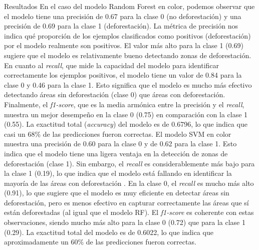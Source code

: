 \documentclass[11pt]{article}
\begin{document}
\begin{section}{Resultados}
En el caso del modelo Random Forest en color, podemos observar que el modelo tiene una precisión de 0.67 para la clase 0 (no deforestación) y una precisión de 0.69 para la clase 1 (deforestación). La métrica de precisión nos indica qué proporción de los ejemplos clasificados como positivos (deforestación) por el modelo realmente son positivos. El valor más alto para la clase 1 (0.69) sugiere que el modelo es relativamente bueno detectando zonas de deforestación. En cuanto al \textit{recall}, que mide la capacidad del modelo para identificar correctamente los ejemplos positivos, el modelo tiene un valor de 0.84 para la clase 0 y 0.46 para la clase 1. Esto significa que el modelo es mucho más efectivo detectando áreas sin deforestación (clase 0) que áreas con deforestación. Finalmente, el \textit{f1-score}, que es la media armónica entre la precisión y el \textit{recall}, muestra un mejor desempeño en la clase 0 (0.75) en comparación con la clase 1 (0.55). La exactitud total (\textit{accuracy}) del modelo es de 0.6796, lo que indica que casi un 68\% de las predicciones fueron correctas. El modelo SVM en color muestra una precisión de 0.60 para la clase 0 y de 0.62 para la clase 1. Esto indica que el modelo tiene una ligera ventaja en la detección de zonas de deforestación (clase 1). Sin embargo, el \textit{recall} es considerablemente más bajo para la clase 1 (0.19), lo que indica que el modelo está fallando en identificar la mayoría de las áreas con deforestación . En la clase 0, el \textit{recall} es mucho más alto (0.91), lo que sugiere que el modelo es muy eficiente en detectar áreas sin deforestación, pero es menos efectivo en capturar correctamente las áreas que sí están deforestadas (al igual que el modelo RF). El \textit{f1-score} es coherente con estas observaciones, siendo mucho más alto para la clase 0 (0.72) que para la clase 1 (0.29). La exactitud total del modelo es de 0.6022, lo que indica que aproximadamente un 60\% de las predicciones fueron correctas.
\\
\\

\end{section}
\end{document}
